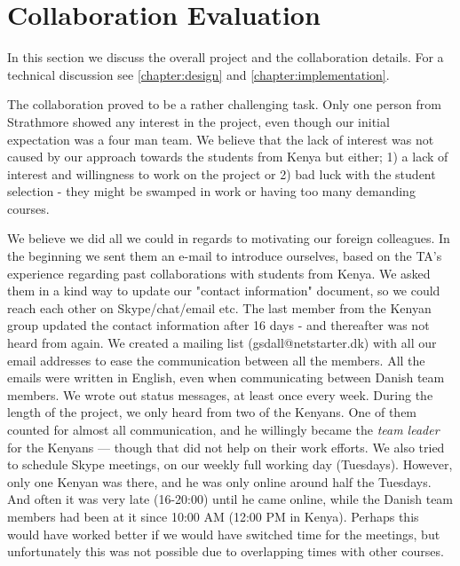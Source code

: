 \section{Collaboration Evaluation}\label{sec:discussioncollaboration}
In this section we discuss the overall project and the collaboration details. For a technical discussion see \ref{chapter:design} and \ref{chapter:implementation}. 

The collaboration proved to be a rather challenging task. Only one person from Strathmore showed any interest in the project, even though our initial expectation was a four man team. We believe that the lack of interest was not caused by our approach towards the students from Kenya but either; 1) a lack of interest and willingness to work on the project or 2) bad luck with the student selection - they might be swamped in work or having too many demanding courses.

We believe we did all we could in regards to motivating our foreign colleagues. In the beginning we sent them an e-mail to introduce ourselves, based on the TA's experience regarding past collaborations with students from Kenya. We asked them in a kind way to update our "contact information" document, so we could reach each other on Skype/chat/email etc. The last member from the Kenyan group updated the contact information after 16 days - and thereafter was not heard from again. We created a mailing list (gsdall@netstarter.dk) with all our email addresses to ease the communication between all the members. All the emails were written in English, even when communicating between Danish team members. We wrote out status messages, at least once every week. During the length of the project, we only heard from two of the Kenyans. One of them counted for almost all communication, and he willingly became the \textit{team leader} for the Kenyans --- though that did not help on their work efforts. We also tried to schedule Skype meetings, on our weekly full working day (Tuesdays). However, only one Kenyan was there, and he was only online around half the Tuesdays. And often it was very late (16-20:00) until he came online, while the Danish team members had been at it since 10:00 AM (12:00 PM in Kenya). Perhaps this would have worked better if we would have switched time for the meetings, but unfortunately this was not possible due to overlapping times with other courses.

